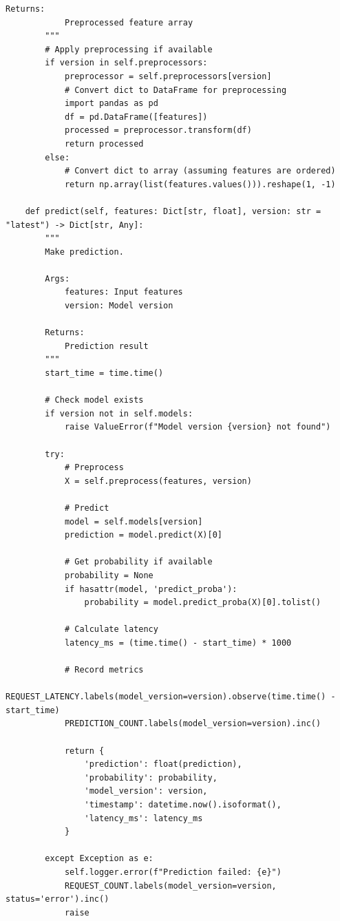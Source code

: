 \begin{lstlisting}[style=python, caption={Production-Grade FastAPI Model Serving}]
        Returns:
            Preprocessed feature array
        """
        # Apply preprocessing if available
        if version in self.preprocessors:
            preprocessor = self.preprocessors[version]
            # Convert dict to DataFrame for preprocessing
            import pandas as pd
            df = pd.DataFrame([features])
            processed = preprocessor.transform(df)
            return processed
        else:
            # Convert dict to array (assuming features are ordered)
            return np.array(list(features.values())).reshape(1, -1)

    def predict(self, features: Dict[str, float], version: str = "latest") -> Dict[str, Any]:
        """
        Make prediction.

        Args:
            features: Input features
            version: Model version

        Returns:
            Prediction result
        """
        start_time = time.time()

        # Check model exists
        if version not in self.models:
            raise ValueError(f"Model version {version} not found")

        try:
            # Preprocess
            X = self.preprocess(features, version)

            # Predict
            model = self.models[version]
            prediction = model.predict(X)[0]

            # Get probability if available
            probability = None
            if hasattr(model, 'predict_proba'):
                probability = model.predict_proba(X)[0].tolist()

            # Calculate latency
            latency_ms = (time.time() - start_time) * 1000

            # Record metrics
            REQUEST_LATENCY.labels(model_version=version).observe(time.time() - start_time)
            PREDICTION_COUNT.labels(model_version=version).inc()

            return {
                'prediction': float(prediction),
                'probability': probability,
                'model_version': version,
                'timestamp': datetime.now().isoformat(),
                'latency_ms': latency_ms
            }

        except Exception as e:
            self.logger.error(f"Prediction failed: {e}")
            REQUEST_COUNT.labels(model_version=version, status='error').inc()
            raise


\end{lstlisting}
